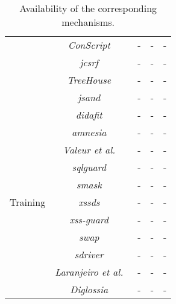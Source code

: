 \documentclass[conference]{IEEEtran}
\begin{document}
\begin{table*}
\begin{threeparttable}
\begin{small}
{\begin{tabular}{l|c|ccc}
	&   {\it ConScript}~\cite{ML10} & - & - & - \\
	&   {\it j{\sc csrf}}~\cite{PS11} & - & - & - \\
    &   {\it TreeHouse}~\cite{IW12} & - & - & - \\
   	&   {\it {\sc js}and}~\cite{AVBPDP12} & - & - & - \\
	\hline
	\hline  
        \multirow{12}{*}{Training}
    &   {\it {\sc didafit}}~\cite{LLW02} & - & - & - \\
	&   {\it {\sc amnesia}}~\cite{HO05,HO06,HO05b} & - & - & - \\ 
	&   {\it Valeur et al.}~\cite{VMV05} & - & - & - \\
	& 	{\it {\sc sqlg}uard}~\cite{BWS05} & - & - & - \\
	& 	{\it {\sc sm}ask}~\cite{JB07} & - & - & - \\
	& 	{\it {\sc xssds}}~\cite{JEP08} & - & - & - \\
    & 	{\it {\sc xss-guard}}~\cite{BV08} & - & - & - \\
    & 	{\it {\sc swap}}~\cite{WPLKK09} & - & - & - \\
	& 	{\it {\sc sd}river}~\cite{MS09,MKS09,MKLS11} & - & - & - \\
	& 	{\it Laranjeiro et al.}~\cite{LVM09,ALVM09,LVM10} & - & - & - \\
	& 	{\it Diglossia}~\cite{SMS13} & - & - & - \\
	\hline
    \end{tabular}}
    \caption{Availability of the corresponding mechanisms.}
    \label{tab:comp2}
    \end{small}
    \end{threeparttable}
\end{table*}



\end{document}
